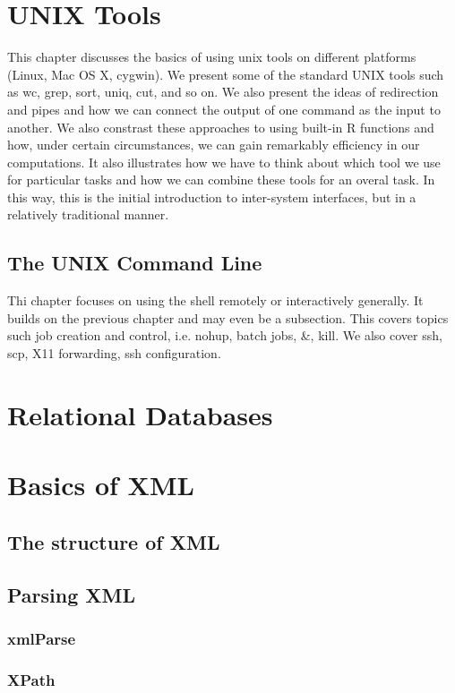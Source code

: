 \documentclass[11pt]{book}
\begin{document}
\chapter{UNIX Tools}
This chapter discusses the basics of using unix tools on different
platforms (Linux, Mac OS X, cygwin).  We present some of the standard
UNIX tools such as wc, grep, sort, uniq, cut, and so on.  We also
present the ideas of redirection and pipes and how we can connect the
output of one command as the input to another.  We also constrast
these approaches to using built-in R functions and how, under certain
circumstances, we can gain remarkably efficiency in our computations.
It also illustrates how we have to think about which tool we use for
particular tasks and how we can combine these tools for an overal
task. In this way, this is the initial introduction to inter-system
interfaces, but in a relatively traditional manner.


\section{The UNIX Command Line}
Thi chapter focuses on using the shell remotely or interactively
generally.  It builds on the previous chapter and may even be a
subsection.  This covers topics such job creation and control,
i.e. nohup, batch jobs, \&, kill.  We also cover ssh, scp, X11
forwarding, ssh configuration.


%

\chapter{Relational Databases}
% 

\chapter{Basics of XML}
\section{The structure of XML}
\section{Parsing XML}
 \subsection{xmlParse}
 \subsection{XPath}
\end{document}
